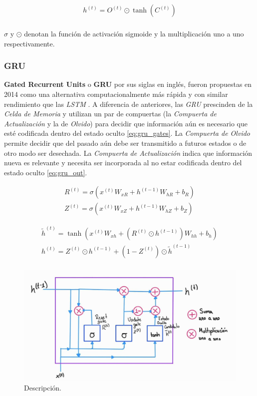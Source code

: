 \begin{equation}
    \begin{split}
        h^{(t)} =  O^{(t)} \odot \tanh(C^{(t)}) \\
    \end{split}
\end{equation}

$\sigma$ y $\odot$ denotan la función de activación sigmoide y la multiplicación uno a uno
respectivamente.


\subsubsection{GRU}

\textbf{Gated Recurrent Units} o \textbf{GRU} por sus siglas en inglés, fueron propuestas en 2014
\cite{GRU1} como una alternativa computacionalmente más rápida y con similar rendimiento que las
\textit{LSTM} \cite{GRU2}. A diferencia de anteriores, las \textit{GRU} prescinden de la
\textit{Celda de Memoria} y utilizan un par de compuertas (la \textit{Compuerta de Actualización} y
la de \textit{Olvido}) para decidir que información aún es necesario que esté codificada dentro del
estado oculto \ref{eq:gru_gates}.
La \textit{Compuerta de Olvido} permite decidir que del pasado aún debe ser transmitido a futuros
estados o de otro modo ser desechada. La \textit{Compuerta de Actualización} indica que información nueva es relevante y
necesita ser incorporada al no estar codificada dentro del estado oculto \ref{eq:gru_out}.

\begin{equation}
    \begin{split}
        R^{(t)} = \sigma(x^{(t)} W_{xR} + h^{(t-1)} W_{hR} + b_R)\\
        Z^{(t)} = \sigma(x^{(t)} W_{xZ} + h^{(t-1)} W_{hZ} + b_Z)
    \end{split}
    \label{eq:gru_gates}
\end{equation}

\begin{equation}
    \begin{split}
        \tilde h^{(t)} = \tanh(x^{(t)} W_{xh} + ( R^{(t)} \odot h^{(t-1)}) W_{hh} + b_h)\\
        h^{(t)} =  Z^{(t)} \odot h^{(t-1)} + (1 - Z^{(t)}) \odot \tilde h^{(t-1)} \\
    \end{split}
    \label{eq:gru_out}
\end{equation}

\begin{figure}[ht!]
\centering
\includegraphics[width=1.0 \textwidth]{Chapters/1. Transformer/Figures/rnn/GRU.jpg}
\caption{Descripción.}
\label{fig:rnn_gru}
\end{figure}
